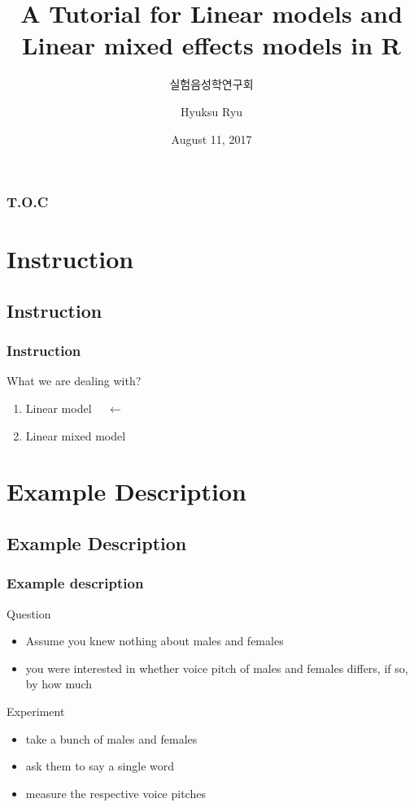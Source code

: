 \documentclass{beamer}\usepackage[]{graphicx}\usepackage[]{color}
\title[LMM Tutorial]{A Tutorial for Linear models and Linear mixed effects models in R}
\subtitle[실험음성학연구회]{실험음성학연구회}
\author[Ryu et al.]{Hyuksu Ryu\inst{1}}
\institute[Naver Clova]{\inst{1} Naver Clova}
\date{August 11, 2017}
\begin{document}
\begin{frame}
\maketitle
\end{frame}

\begin{frame}
\frametitle{T.O.C}
	\tableofcontents[subsectionstyle=hide]
\end{frame}

\section{Instruction}
\subsection{Instruction}

\begin{frame}
\frametitle{Instruction}
What we are dealing with?
\begin{enumerate}
\item \alert{Linear model} $\quad \leftarrow$
\item Linear mixed model
\end{enumerate}
\end{frame}

\section{Example Description}
\subsection{Example Description}

\begin{frame}
\frametitle{Example description}
Question
\begin{itemize}
\item Assume you knew nothing about males and females
\item you were interested in whether \alert{voice pitch} of males and females differs, if so, by how much
\end{itemize}

\vspace{9pt}
Experiment
\begin{itemize}
\item take a bunch of males and females
\item ask them to say a single word
\item measure the respective voice pitches
\end{itemize}

\end{frame}
\end{document}
